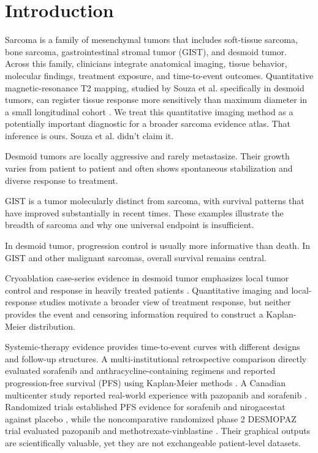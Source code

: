 \documentclass[17pt]{extarticle}
\begin{document}
\section{Introduction}

Sarcoma is a family of mesenchymal tumors that includes soft-tissue sarcoma, bone sarcoma, gastrointestinal stromal tumor (GIST), and desmoid tumor. Across this family, clinicians integrate anatomical imaging, tissue behavior, molecular findings, treatment exposure, and time-to-event outcomes. Quantitative magnetic-resonance T2 mapping, studied by Souza et al. specifically in desmoid tumors, can register tissue response more sensitively than maximum diameter in a small longitudinal cohort \citep{souza2023t2}. We treat this quantitative imaging method as a potentially important diagnostic for a broader sarcoma evidence atlas. That inference is ours. Souza et al. didn't claim it.

Desmoid tumors are locally aggressive and rarely metastasize. Their growth varies from patient to patient and often shows spontaneous stabilization and diverse response to treatment.

GIST is a tumor molecularly distinct from sarcoma, with survival patterns that have improved substantially in recent times. These examples illustrate the breadth of sarcoma and why one universal endpoint is insufficient.

In desmoid tumor, progression control is usually more informative than death. In GIST and other malignant sarcomas, overall survival remains central.

Cryoablation case-series evidence in desmoid tumor emphasizes local tumor control and response in heavily treated patients \citep{liu2022cryo}. Quantitative imaging and local-response studies motivate a broader view of treatment response, but neither provides the event and censoring information required to construct a Kaplan-Meier distribution.

Systemic-therapy evidence provides time-to-event curves with different designs and follow-up structures. A multi-institutional retrospective comparison directly evaluated sorafenib and anthracycline-containing regimens and reported progression-free survival (PFS) using Kaplan-Meier methods \citep{costa2025sorafenib}. A Canadian multicenter study reported real-world experience with pazopanib and sorafenib \citep{noujaim2024realworld}. Randomized trials established PFS evidence for sorafenib and nirogacestat against placebo \citep{gounder2018sorafenib,gounder2023nirogacestat}, while the noncomparative randomized phase 2 DESMOPAZ trial evaluated pazopanib and methotrexate-vinblastine \citep{toulmonde2019desmopaz}. Their graphical outputs are scientifically valuable, yet they are not exchangeable patient-level datasets.
\end{document}
